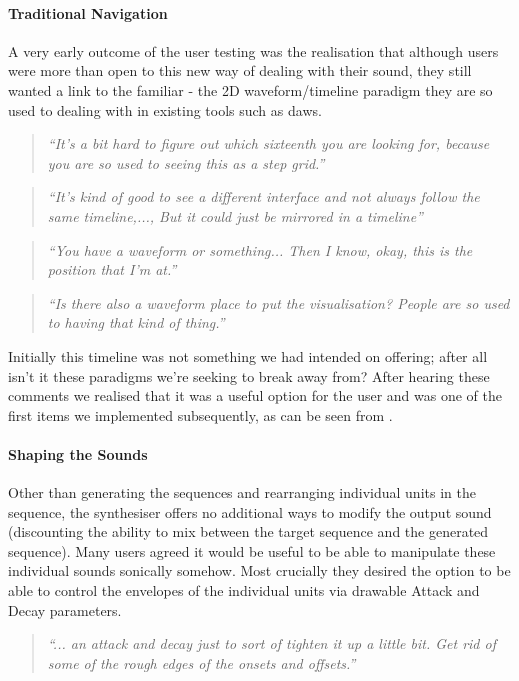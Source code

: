 \paragraph{Traditional Navigation}

A very early outcome of the user testing was the realisation that although users were more than open to this new way of dealing with their sound, they still wanted a link to the familiar - the  2D waveform/timeline paradigm they are so used to dealing with in existing tools such as \acrshort{daw}s.

\blockquote{\textit{“It's a bit hard to figure out which sixteenth you are looking for, because you are so used to seeing this as a step grid.”}}

\blockquote{\textit{“It's kind of good to see a different interface and not always follow the same timeline,..., But it could just be mirrored in a timeline”}}

\blockquote{\textit{“You have a waveform or something...  Then I know, okay, this is the position that I'm at.”}}

\blockquote{\textit{“Is there also a  waveform place to put the visualisation? People are so used to having that kind of thing.”}}

Initially this timeline was not something we had intended on offering; after all isn't it these paradigms we're seeking to break away from? After hearing these comments we realised that it was a useful option for the user and was one of the first items we implemented subsequently, as can be seen from .

\paragraph{Shaping the Sounds}

Other than generating the sequences and rearranging individual units in the sequence, the synthesiser offers no additional ways to modify the output sound (discounting the ability to mix between the target sequence and the generated sequence). Many users agreed it would be useful to be able to manipulate these individual sounds sonically somehow. Most crucially they desired the option to be able to control the envelopes of the individual units via drawable Attack and Decay parameters.
  
\blockquote{\textit{“... an attack and decay just to sort of tighten it up a little bit. Get rid of some of the rough edges of the onsets and offsets.”}}

